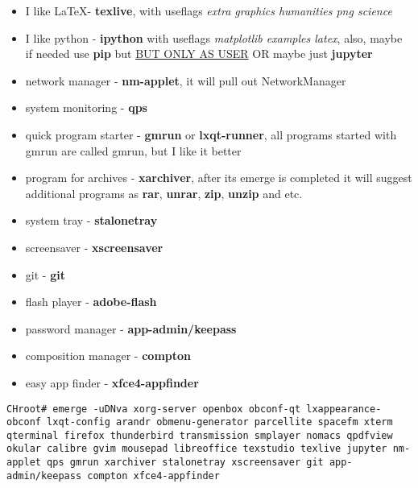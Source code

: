 \documentclass[10pt,a4paper]{article}
\begin{document}
\begin{itemize}
                        \item I like \LaTeX - \textbf{texlive}, with useflags \textit{extra graphics humanities png science}
                        \item I like python - \textbf{ipython} with useflags \textit{matplotlib examples latex}, also, maybe if needed use \textbf{pip} but \href{https://wiki.gentoo.org/wiki/Pip#Invocation}{BUT ONLY AS USER} OR maybe just \textbf{jupyter}
                        \item network manager - \textbf{nm-applet}, it will pull out NetworkManager
                        \item system monitoring - \textbf{qps}
                        \item quick program starter - \textbf{gmrun} or \textbf{lxqt-runner}, all programs started with gmrun are called gmrun, but I like it better
                        \item program for archives - \textbf{xarchiver}, after its emerge is completed it will suggest additional programs as \textbf{rar}, \textbf{unrar}, \textbf{zip}, \textbf{unzip} and etc.
                        \item system tray - \textbf{stalonetray}
                        \item screensaver - \textbf{xscreensaver}
                        \item git - \textbf{git}
                        \item flash player - \textbf{adobe-flash}
                        \item password manager - \textbf{app-admin/keepass}
                        \item composition manager - \textbf{compton}
                        \item easy app finder - \textbf{xfce4-appfinder}
                    \end{itemize}

                    \begin{lstlisting}[style=BashInputCHRoot]
 CHroot# emerge -uDNva xorg-server openbox obconf-qt lxappearance-obconf lxqt-config arandr obmenu-generator parcellite spacefm xterm qterminal firefox thunderbird transmission smplayer nomacs qpdfview okular calibre gvim mousepad libreoffice texstudio texlive jupyter nm-applet qps gmrun xarchiver stalonetray xscreensaver git app-admin/keepass compton xfce4-appfinder
                    \end{lstlisting}
\end{document}
